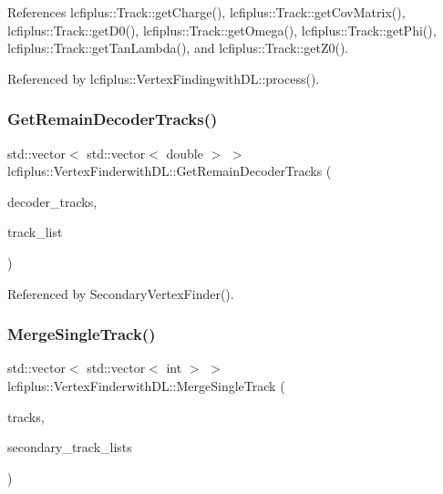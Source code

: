 References lcfiplus\+::\+Track\+::get\+Charge(), lcfiplus\+::\+Track\+::get\+Cov\+Matrix(), lcfiplus\+::\+Track\+::get\+D0(), lcfiplus\+::\+Track\+::get\+Omega(), lcfiplus\+::\+Track\+::get\+Phi(), lcfiplus\+::\+Track\+::get\+Tan\+Lambda(), and lcfiplus\+::\+Track\+::get\+Z0().



Referenced by lcfiplus\+::\+Vertex\+Findingwith\+D\+L\+::process().

\mbox{\label{namespacelcfiplus_1_1VertexFinderwithDL_a302fc2df867f2ecbef3759a1e2424982}} 
\subsubsection{Get\+Remain\+Decoder\+Tracks()}
{\footnotesize\ttfamily std\+::vector$<$ std\+::vector$<$ double $>$ $>$ lcfiplus\+::\+Vertex\+Finderwith\+D\+L\+::\+Get\+Remain\+Decoder\+Tracks (\begin{DoxyParamCaption}\item[{std\+::vector$<$ std\+::vector$<$ double $>$ $>$}]{decoder\+\_\+tracks,  }\item[{std\+::vector$<$ int $>$}]{track\+\_\+list }\end{DoxyParamCaption})}



Referenced by Secondary\+Vertex\+Finder().

\mbox{\label{namespacelcfiplus_1_1VertexFinderwithDL_ad53c2b3b1bdcc626d80bfb272af0e5b6}} 
\subsubsection{Merge\+Single\+Track()}
{\footnotesize\ttfamily std\+::vector$<$ std\+::vector$<$ int $>$ $>$ lcfiplus\+::\+Vertex\+Finderwith\+D\+L\+::\+Merge\+Single\+Track (\begin{DoxyParamCaption}\item[{\textbf{ Track\+Vec} \&}]{tracks,  }\item[{std\+::vector$<$ std\+::vector$<$ int $>$ $>$}]{secondary\+\_\+track\+\_\+lists }\end{DoxyParamCaption})}



